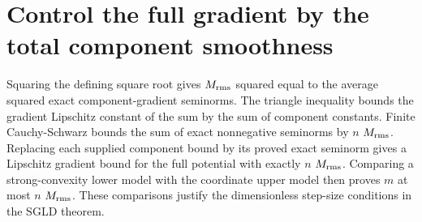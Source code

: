 \documentclass[11pt,a4paper]{article}
\begin{document}
\section{\texorpdfstring{Control the full gradient by the total component smoothness}{Control the full gradient by the total component smoothness}}


Squaring the defining square root gives \(M_{\rm rms}\) squared equal to the average squared exact component-gradient seminorms. The triangle inequality bounds the gradient Lipschitz constant of the sum by the sum of component constants. Finite Cauchy-Schwarz bounds the sum of exact nonnegative seminorms by \(n\) \(M_{\rm rms}\). Replacing each supplied component bound by its proved exact seminorm gives a Lipschitz gradient bound for the full potential with exactly \(n\) \(M_{\rm rms}\). Comparing a strong-convexity lower model with the coordinate upper model then proves \(m\) at most \(n\) \(M_{\rm rms}\). These comparisons justify the dimensionless step-size conditions in the SGLD theorem.
\end{document}
